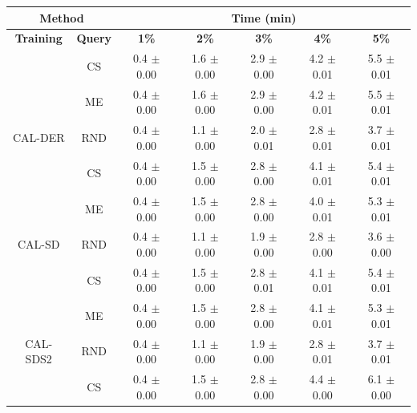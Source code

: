 \begin{table}[htbp]
\centering

\begin{tabular*}{\linewidth}{c|c|@{\extracolsep{\fill}}ccccc}
\toprule
\multicolumn{2}{c|}{\textbf{Method}} & \multicolumn{5}{c}{\textbf{Time (min)}} \\
\midrule
\textbf{Training} & \textbf{Query} & \textbf{1\%} & \textbf{2\%} & \textbf{3\%} & \textbf{4\%} & \textbf{5\%}\\
\midrule
 & CS & 0.4 $\pm$ {\small 0.00} & 1.6 $\pm$ {\small 0.00} & 2.9 $\pm$ {\small 0.00} & 4.2 $\pm$ {\small 0.01} & 5.5 $\pm$ {\small 0.01}\\

 & ME & 0.4 $\pm$ {\small 0.00} & 1.6 $\pm$ {\small 0.00} & 2.9 $\pm$ {\small 0.00} & 4.2 $\pm$ {\small 0.01} & 5.5 $\pm$ {\small 0.01}\\

\multirow{-3}{*}{\raggedright\arraybackslash CAL-DER} & RND & 0.4 $\pm$ {\small 0.00} & 1.1 $\pm$ {\small 0.00} & 2.0 $\pm$ {\small 0.01} & 2.8 $\pm$ {\small 0.01} & 3.7 $\pm$ {\small 0.01}\\
\midrule
 & CS & 0.4 $\pm$ {\small 0.00} & 1.5 $\pm$ {\small 0.00} & 2.8 $\pm$ {\small 0.00} & 4.1 $\pm$ {\small 0.01} & 5.4 $\pm$ {\small 0.01}\\

 & ME & 0.4 $\pm$ {\small 0.00} & 1.5 $\pm$ {\small 0.00} & 2.8 $\pm$ {\small 0.00} & 4.0 $\pm$ {\small 0.01} & 5.3 $\pm$ {\small 0.01}\\

\multirow{-3}{*}{\raggedright\arraybackslash CAL-SD} & RND & 0.4 $\pm$ {\small 0.00} & 1.1 $\pm$ {\small 0.00} & 1.9 $\pm$ {\small 0.00} & 2.8 $\pm$ {\small 0.00} & 3.6 $\pm$ {\small 0.00}\\
\midrule
 & CS & 0.4 $\pm$ {\small 0.00} & 1.5 $\pm$ {\small 0.00} & 2.8 $\pm$ {\small 0.01} & 4.1 $\pm$ {\small 0.01} & 5.4 $\pm$ {\small 0.01}\\

 & ME & 0.4 $\pm$ {\small 0.00} & 1.5 $\pm$ {\small 0.00} & 2.8 $\pm$ {\small 0.00} & 4.1 $\pm$ {\small 0.01} & 5.3 $\pm$ {\small 0.01}\\

\multirow{-3}{*}{\raggedright\arraybackslash CAL-SDS2} & RND & 0.4 $\pm$ {\small 0.00} & 1.1 $\pm$ {\small 0.00} & 1.9 $\pm$ {\small 0.00} & 2.8 $\pm$ {\small 0.01} & 3.7 $\pm$ {\small 0.01}\\
\midrule
 & CS & 0.4 $\pm$ {\small 0.00} & 1.5 $\pm$ {\small 0.00} & 2.8 $\pm$ {\small 0.00} & 4.4 $\pm$ {\small 0.00} & 6.1 $\pm$ {\small 0.00}\\


\end{tabular*}
\end{table}

